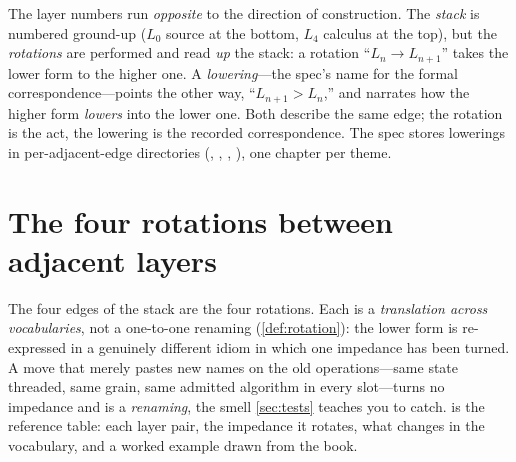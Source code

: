 \begin{notationbox}
The layer numbers run \emph{opposite} to the direction of construction. The
\emph{stack} is numbered ground-up ($L_0$ source at the bottom, $L_4$ calculus at the
top), but the \emph{rotations} are performed and read \emph{up} the stack: a rotation
``$L_n\!\to\!L_{n+1}$'' takes the lower form to the higher one. A
\emph{lowering}---the spec's name for the formal correspondence---points the other
way, ``$L_{n+1}>L_n$,'' and narrates how the higher form \emph{lowers} into the lower
one. Both describe the same edge; the rotation is the act, the lowering is the
recorded correspondence. The spec stores lowerings in per-adjacent-edge directories
(, , , ), one chapter per theme.
\end{notationbox}

\section{The four rotations between adjacent layers}
\label{sec:approtations}

The four edges of the stack are the four rotations. Each is a \emph{translation across
vocabularies}, not a one-to-one renaming (\cref{def:rotation}): the lower form is
re-expressed in a genuinely different idiom in which one impedance has been turned. A
move that merely pastes new names on the old operations---same state threaded, same
grain, same admitted algorithm in every slot---turns no impedance and is a
\emph{renaming}, the smell \cref{sec:tests} teaches you to catch. 
is the reference table: each layer pair, the impedance it rotates, what changes in the
vocabulary, and a worked example drawn from the book.

